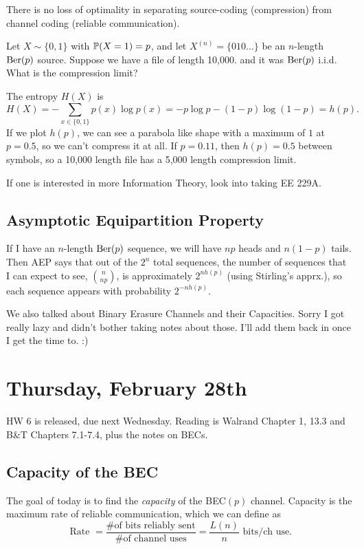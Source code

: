 \documentclass[11 pt]{scrartcl}
\begin{document}
\begin{theorem}[Separation]
    There is no loss of optimality in separating source-coding (compression) from channel coding (reliable communication). 
\end{theorem}

\begin{example}
    Let $X\sim\{0,1\}$ with $\mathbb P(X=1) = p$, and let $X^{(n)} = \{010\dots\}$ be an $n$-length $\text{Ber}(p)$ source. Suppose we have a file of length 10,000. and it was $\text{Ber}(p)$ i.i.d. What is the compression limit?  

    The entropy $H(X)$ is 
    \[ H(X) = -\sum_{x\in\{0,1\}}p(x) \log p(x) = -p\log p - (1-p)\log(1-p) = h(p).\] 
    If we plot $h(p)$, we can see a parabola like shape with a maximum of $1$ at $p = 0.5$, so we can't compress it at all. If $p = 0.11$, then $h(p) = 0.5$ between symbols, so a 10,000 length file has a 5,000 length compression limit. 
\end{example}

If one is interested in more Information Theory, look into taking EE 229A. 

\subsection{Asymptotic Equipartition Property}
If I have an $n$-length $\text{Ber}(p)$ sequence, we will have $np$ heads and $n(1-p)$ tails. Then AEP says that out of the $2^n$ total sequences, the number of sequences that I can expect to see, $\binom{n}{np}$, is approximately $2^{n h(p)}$ (using Stirling's apprx.), so each sequence appears with probability $2^{-n h(p)}$. 

We also talked about Binary Erasure Channels and their Capacities. Sorry I got really lazy and didn't bother taking notes about those. I'll add them back in once I get the time to. :) 

\newpage
\section{Thursday, February 28th}
HW 6 is released, due next Wednesday. Reading is Walrand Chapter 1, 13.3 and B\&T Chapters 7.1-7.4, plus the notes on BECs. 

\subsection{Capacity of the BEC}
The goal of today is to find the \emph{capacity} of the BEC$(p)$ channel. Capacity is the maximum rate of reliable communication, which we can define as 
\[ \text{ Rate } = \dfrac{ \text{\# of bits reliably sent}}{\text{\# of channel uses}} = \dfrac{L(n)}{n} \text{ bits/ch use}.\]
\end{document}
